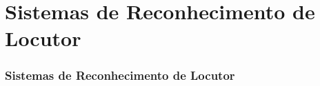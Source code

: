 \section{Sistemas de Reconhecimento de Locutor}
\label{sec:speaker-recognition-systems}

\contentscurrent

\begin{frame}
\frametitle{Sistemas de Reconhecimento de Locutor}
\end{frame}